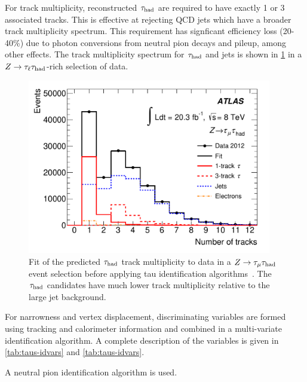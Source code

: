 For track multiplicity, reconstructed $\tau_\text{had}$ are required to have exactly 1 or 3 associated tracks. This is effective at rejecting QCD jets which have a broader track multiplicity spectrum. This requirement has signficant efficiency loss (20-40\%) due to photon conversions from neutral pion decays and pileup, among other effects. The track multiplicity spectrum for $\tau_\text{had}$ and jets is shown in \cref{fig:taus-trackmultiplicity} in a $Z\rightarrow\tau_\ell\tau_\text{had}$-rich selection of data.

\begin{figure}[tp]
  \centering
  \includegraphics[width=0.95\textwidth]{figures/PERF-2013-06/fig_10a}
  \caption{Fit of the predicted $\tau_\text{had}$ track multiplicity to data in a $Z\rightarrow\tau_\mu \tau_\text{had}$ event selection before applying tau identification algorithms~\cite{PERF-2013-06}. The $\tau_\text{had}$ candidates have much lower track multiplicity relative to the large jet background.}
  \label{fig:taus-trackmultiplicity}
\end{figure}

For narrowness and vertex displacement, discriminating variables are formed using tracking and calorimeter information and combined in a multi-variate identification algorithm. A complete description of the variables is given in \cref{tab:taus-idvars} and \cref{tab:taus-idvars}.

A neutral pion identification algorithm is used.

